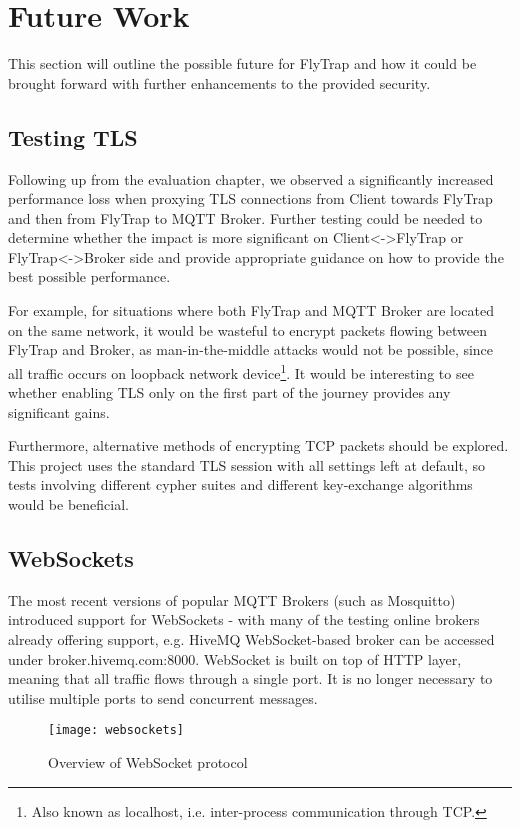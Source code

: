 \section{Future Work}
This section will outline the possible future for FlyTrap and how it could be brought forward with further enhancements to the provided security.
\subsection{Testing TLS}
Following up from the evaluation chapter, we observed a significantly increased performance loss when proxying TLS connections from Client towards FlyTrap and then from FlyTrap to MQTT Broker. Further testing could be needed to determine whether the impact is more significant on \mbox{Client<->FlyTrap} or FlyTrap<->Broker side and provide appropriate guidance on how to provide the best possible performance.

For example, for situations where both FlyTrap and MQTT Broker are located on the same network, it would be wasteful to encrypt packets flowing between FlyTrap and Broker, as man-in-the-middle attacks would not be possible, since all traffic occurs on loopback network device\footnote{Also known as localhost, i.e. inter-process communication through TCP.}. It would be interesting to see whether enabling TLS only on the first part of the journey provides any significant gains.

Furthermore, alternative methods of encrypting TCP packets should be explored. This project uses the standard TLS session with all settings left at default, so tests involving different cypher suites and different key-exchange algorithms would be beneficial.
\subsection{WebSockets}
The most recent versions of popular MQTT Brokers (such as Mosquitto) introduced support for WebSockets - with many of the testing online brokers already offering support, e.g. HiveMQ WebSocket-based broker can be accessed under broker.hivemq.com:8000. WebSocket \cite{fette2011websocket} is built on top of HTTP layer, meaning that all traffic flows through a single port. It is no longer necessary to utilise multiple ports to send concurrent messages.

\begin{figure}[h]
    \centering
    \texttt{[image: websockets]}
    \caption{Overview of WebSocket protocol}
    \label{fig:websockets}
\end{figure}

